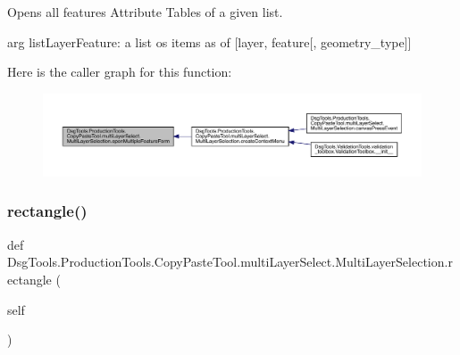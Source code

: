 \begin{DoxyVerb}Opens all features Attribute Tables of a given list.

arg listLayerFeature: a list os items as of [layer, feature[, geometry_type]]
\end{DoxyVerb}
 Here is the caller graph for this function\+:
\nopagebreak
\begin{figure}[H]
\begin{center}
\leavevmode
\includegraphics[width=350pt]{class_dsg_tools_1_1_production_tools_1_1_copy_paste_tool_1_1multi_layer_select_1_1_multi_layer_selection_a6508f006e6f74fb040286a58d845f774_icgraph}
\end{center}
\end{figure}
\mbox{\label{class_dsg_tools_1_1_production_tools_1_1_copy_paste_tool_1_1multi_layer_select_1_1_multi_layer_selection_acce42c0397d317ed7cd7958ab15b2f42}} 
\subsubsection{\texorpdfstring{rectangle()}{rectangle()}}
{\footnotesize\ttfamily def Dsg\+Tools.\+Production\+Tools.\+Copy\+Paste\+Tool.\+multi\+Layer\+Select.\+Multi\+Layer\+Selection.\+rectangle (\begin{DoxyParamCaption}\item[{}]{self }\end{DoxyParamCaption})}

